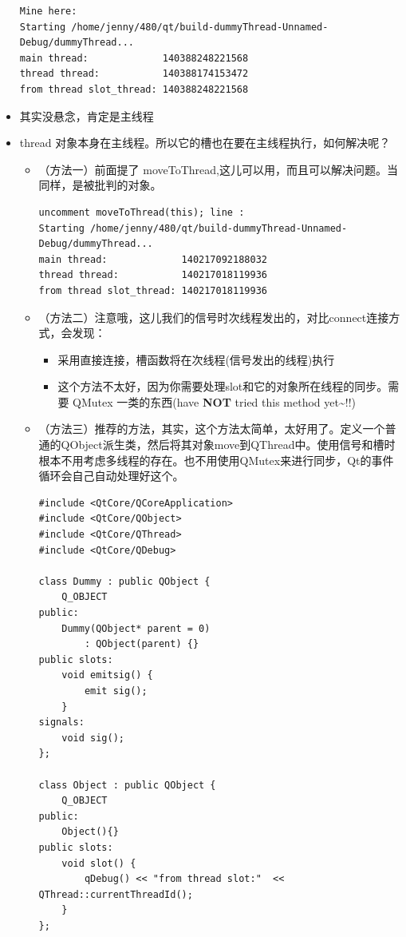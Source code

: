 \documentclass[9pt,b5paper]{article}
\begin{document}
\begin{itemize}
\begin{lstlisting}
Mine here: 
Starting /home/jenny/480/qt/build-dummyThread-Unnamed-Debug/dummyThread...
main thread:             140388248221568 
thread thread:           140388174153472 
from thread slot_thread: 140388248221568
\end{lstlisting}
\item 其实没悬念，肯定是主线程
\item thread 对象本身在主线程。所以它的槽也在要在主线程执行，如何解决呢？
\begin{itemize}
\item （方法一）前面提了 moveToThread,这儿可以用，而且可以解决问题。当同样，是被批判的对象。
\lstset{language=java,label= ,caption= ,numbers=none}
\begin{lstlisting}
uncomment moveToThread(this); line :
Starting /home/jenny/480/qt/build-dummyThread-Unnamed-Debug/dummyThread...
main thread:             140217092188032 
thread thread:           140217018119936 
from thread slot_thread: 140217018119936
\end{lstlisting}
\item （方法二）注意哦，这儿我们的信号时次线程发出的，对比connect连接方式，会发现：
\begin{itemize}
\item 采用直接连接，槽函数将在次线程(信号发出的线程)执行
\item 这个方法不太好，因为你需要处理slot和它的对象所在线程的同步。需要 QMutex 一类的东西(have \textbf{NOT} tried this method yet\textasciitilde{}!!)
\end{itemize}
\item （方法三）推荐的方法，其实，这个方法太简单，太好用了。定义一个普通的QObject派生类，然后将其对象move到QThread中。使用信号和槽时根本不用考虑多线程的存在。也不用使用QMutex来进行同步，Qt的事件循环会自己自动处理好这个。
\lstset{language=java,label= ,caption= ,numbers=none}
\begin{lstlisting}
#include <QtCore/QCoreApplication>   
#include <QtCore/QObject>   
#include <QtCore/QThread>   
#include <QtCore/QDebug>    

class Dummy : public QObject {       
    Q_OBJECT   
public:
    Dummy(QObject* parent = 0)
        : QObject(parent) {}   
public slots:
    void emitsig() {
        emit sig();       
    }
signals:
    void sig();
};

class Object : public QObject {       
    Q_OBJECT   
public:
    Object(){}
public slots:
    void slot() {    
        qDebug() << "from thread slot:"  << QThread::currentThreadId();       
    }   
};    


\end{lstlisting}
\end{itemize}
\end{itemize}
\end{document}
